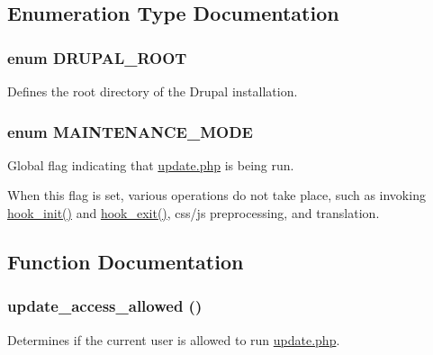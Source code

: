 \subsection{Enumeration Type Documentation}
\hypertarget{update_8php_a21cf187d162beffb1fbc5a1d1098f4f9}{
\subsubsection[{DRUPAL\_\-ROOT}]{\setlength{\rightskip}{0pt plus 5cm}enum {\bf DRUPAL\_\-ROOT}}}
\label{update_8php_a21cf187d162beffb1fbc5a1d1098f4f9}
Defines the root directory of the Drupal installation. \hypertarget{update_8php_a5bf6dfe9ba7ee16c648e3932aa76535d}{
\subsubsection[{MAINTENANCE\_\-MODE}]{\setlength{\rightskip}{0pt plus 5cm}enum {\bf MAINTENANCE\_\-MODE}}}
\label{update_8php_a5bf6dfe9ba7ee16c648e3932aa76535d}
Global flag indicating that \hyperlink{update_8php}{update.php} is being run.

When this flag is set, various operations do not take place, such as invoking \hyperlink{group__hooks_ga74edef0c463436fdbb1f92ef367db051}{hook\_\-init()} and \hyperlink{group__hooks_gaab945bbc2e651510aee460dcc8691366}{hook\_\-exit()}, css/js preprocessing, and translation. 

\subsection{Function Documentation}
\hypertarget{update_8php_a1fc4c34612de9d4097a4c24569f2b789}{
\subsubsection[{update\_\-access\_\-allowed}]{\setlength{\rightskip}{0pt plus 5cm}update\_\-access\_\-allowed ()}}
\label{update_8php_a1fc4c34612de9d4097a4c24569f2b789}
Determines if the current user is allowed to run \hyperlink{update_8php}{update.php}.

